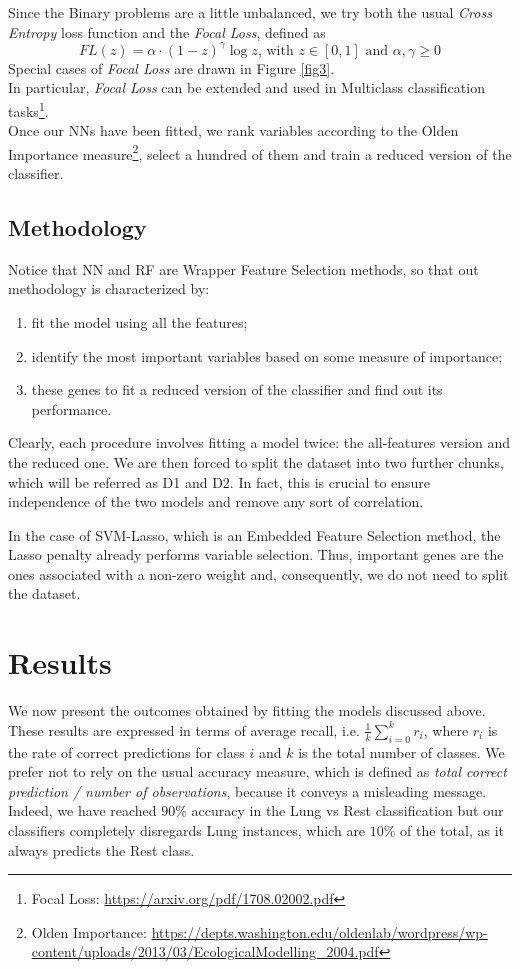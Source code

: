 \documentclass[a4paper,11pt, oneside]{article}  %
\begin{document}
Since the Binary problems are a little unbalanced, we try both the usual \textit{Cross Entropy} loss function and the \textit{Focal Loss}, defined as 
\begin{equation*}
	FL(z) = \alpha \cdot (1 - z)^{\gamma} \log{z} \text{, with }z \in [0,1]  \text{ and } \alpha,  \gamma \geq 0
\end{equation*}
Special cases of \textit{Focal Loss} are drawn in Figure \ref{fig3}. \\
In particular, \textit{Focal Loss} can be extended and used in Multiclass classification tasks\footnote{Focal Loss: \url{https://arxiv.org/pdf/1708.02002.pdf}}. \\
Once our NNs have been fitted, we rank variables according to the Olden Importance measure\footnote{Olden Importance: \url{https://depts.washington.edu/oldenlab/wordpress/wp-content/uploads/2013/03/EcologicalModelling_2004.pdf}},  select a hundred of them and train a reduced version of the classifier. 

\subsection{Methodology}
Notice that NN and RF are Wrapper Feature Selection methods, so that out methodology is characterized by:
\begin{enumerate}
	\item fit the model using all the features;
	\item identify the most important variables based on some measure of importance; \item these genes to fit a reduced version of the classifier and find out its performance.
\end{enumerate} 
Clearly, each procedure involves fitting a model twice: the all-features version and the reduced one.  We are then forced to split the dataset into two further chunks, which will be referred as D1 and D2. In fact, this is crucial to ensure independence of the two models and remove any sort of correlation.

In the case of SVM-Lasso, which is an Embedded Feature Selection method, the Lasso penalty already performs variable selection. Thus, important genes are the ones associated with a non-zero weight and, consequently, we do not need to split the dataset. 

\section{Results}
We now present the outcomes obtained by fitting the models discussed above. These results are expressed in terms of average recall, i.e. $\frac{1}{k} \sum\limits_{i = 0 }^k r_i$, where $r_i$ is the rate of correct predictions for class $i$ and $k$ is the total number of classes. We prefer not to rely on the usual accuracy measure,  which is defined as \textit{total correct prediction / number of observations}, because it conveys a misleading message.  Indeed,  we have reached $90\%$ accuracy in the Lung vs Rest classification but our classifiers completely disregards Lung instances, which are $10\%$ of the total, as it always predicts the Rest class.  
\end{document}

